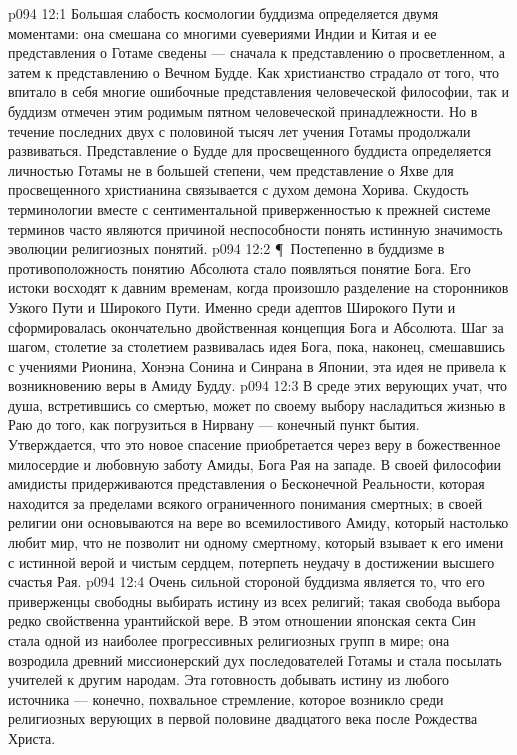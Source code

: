 \vs p094 12:1 Большая слабость космологии буддизма определяется двумя моментами: она смешана со многими суевериями Индии и Китая и ее представления о Готаме сведены --- сначала к представлению о просветленном, а затем к представлению о Вечном Будде. Как христианство страдало от того, что впитало в себя многие ошибочные представления человеческой философии, так и буддизм отмечен этим родимым пятном человеческой принадлежности. Но в течение последних двух с половиной тысяч лет учения Готамы продолжали развиваться. Представление о Будде для просвещенного буддиста определяется личностью Готамы не в большей степени, чем представление о Яхве для просвещенного христианина связывается с духом демона Хорива. Скудость терминологии вместе с сентиментальной приверженностью к прежней системе терминов часто являются причиной неспособности понять истинную значимость эволюции религиозных понятий.
\vs p094 12:2 \P\ Постепенно в буддизме в противоположность понятию Абсолюта стало появляться понятие Бога. Его истоки восходят к давним временам, когда произошло разделение на сторонников Узкого Пути и Широкого Пути. Именно среди адептов Широкого Пути и сформировалась окончательно двойственная концепция Бога и Абсолюта. Шаг за шагом, столетие за столетием развивалась идея Бога, пока, наконец, смешавшись с учениями Рионина, Хонэна Сонина и Синрана в Японии, эта идея не привела к возникновению веры в Амиду Будду.
\vs p094 12:3 В среде этих верующих учат, что душа, встретившись со смертью, может по своему выбору насладиться жизнью в Раю до того, как погрузиться в Нирвану --- конечный пункт бытия. Утверждается, что это новое спасение приобретается через веру в божественное милосердие и любовную заботу Амиды, Бога Рая на западе. В своей философии амидисты придерживаются представления о Бесконечной Реальности, которая находится за пределами всякого ограниченного понимания смертных; в своей религии они основываются на вере во всемилостивого Амиду, который настолько любит мир, что не позволит ни одному смертному, который взывает к его имени с истинной верой и чистым сердцем, потерпеть неудачу в достижении высшего счастья Рая.
\vs p094 12:4 Очень сильной стороной буддизма является то, что его приверженцы свободны выбирать истину из всех религий; такая свобода выбора редко свойственна урантийской вере. В этом отношении японская секта Син стала одной из наиболее прогрессивных религиозных групп в мире; она возродила древний миссионерский дух последователей Готамы и стала посылать учителей к другим народам. Эта готовность добывать истину из любого источника --- конечно, похвальное стремление, которое возникло среди религиозных верующих в первой половине двадцатого века после Рождества Христа.
